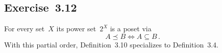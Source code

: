 \subsection{Exercise~3.12}

For every set~$X$ its power set~$2^X$ is a poset via
\[
	A ⪯ B \iff A ⊆ B \,.
\]
With this partial order, Definition~3.10 specializes to Definition~3.4.
